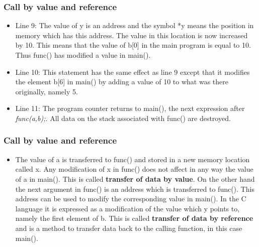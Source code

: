 \documentclass[compress]{beamer}
\begin{document}
\frame
{
  \frametitle{Call by value and reference}
\begin{small}
{\scriptsize
\begin{itemize}
\item Line 9: The value of y is an address and the symbol *y means
the position in memory which has this address. The value in this
location is now increased by 10. This means that the value of b[0] in
the main program is equal to 10. Thus func() has modified a value in main().
%
\item Line 10: This statement has the same effect as line 9 except
that it modifies the element b[6] in main() by adding a value of 10 to
what was there originally, namely 5.
%
\item Line 11: The program counter returns to main(), the next
expression after {\sl func(a,b);}. All data on the stack associated
with func() are destroyed.
%
\end{itemize}
}
\end{small}
}


\frame
{
  \frametitle{Call by value and reference}
\begin{small}
{\scriptsize
\begin{itemize}

\item The value of a is transferred to func() and stored
in a new memory location called x. Any modification of x in func()
does not affect in any way the value of a in main(). This is called {\bf
transfer of data by value}. On the other hand the next argument in
func() is an address which is transferred to func(). This address can
be used to modify the corresponding value in main(). In the C language
it is expressed as a modification of the value
which y points to, namely the first element of b.
This is called {\bf transfer of data by reference} and is a method to
transfer data back to the calling function, in this case  main().

\end{itemize}
}
\end{small}
}

\end{document}
